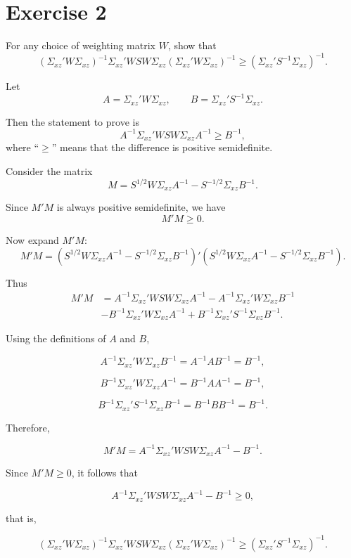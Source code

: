 \documentclass[12pt, letterpaper, onecolumn]{exam}
\begin{document}
\section*{Exercise 2}
For any choice of weighting matrix $W$, show that
$$
    (\Sigma_{xz}' W \Sigma_{xz})^{-1}\Sigma_{xz}' W S W \Sigma_{xz}(\Sigma_{xz}' W \Sigma_{xz})^{-1}
    \geq
    (\Sigma_{xz}' S^{-1}\Sigma_{xz})^{-1}.
$$
\begin{solution}
    Let $$A=\Sigma_{xz}'W\Sigma_{xz}, \qquad B=\Sigma_{xz}'S^{-1}\Sigma_{xz}.$$

    Then the statement to prove is
    $$A^{-1}\Sigma_{xz}'WSW\Sigma_{xz}A^{-1}\ge B^{-1},$$
    where “$\ge$” means that the difference is positive semidefinite.

    Consider the matrix
    $$M=S^{1/2}W\Sigma_{xz}A^{-1}-S^{-1/2}\Sigma_{xz}B^{-1}.$$

    Since $M'M$ is always positive semidefinite, we have
    $$M'M\ge 0.$$

    Now expand $M'M$:
    $$
        M'M
        =
        \left(S^{1/2}W\Sigma_{xz}A^{-1}-S^{-1/2}\Sigma_{xz}B^{-1}\right)'
        \left(S^{1/2}W\Sigma_{xz}A^{-1}-S^{-1/2}\Sigma_{xz}B^{-1}\right).
    $$

    Thus
    $$
        \begin{aligned}
            M'M
             & =A^{-1}\Sigma_{xz}'WSW\Sigma_{xz}A^{-1}-A^{-1}\Sigma_{xz}'W\Sigma_{xz}B^{-1}     \\
             & -B^{-1}\Sigma_{xz}'W\Sigma_{xz}A^{-1}+B^{-1}\Sigma_{xz}'S^{-1}\Sigma_{xz}B^{-1}.
        \end{aligned}
    $$

    Using the definitions of $A$ and $B$,

    $$
        A^{-1}\Sigma_{xz}'W\Sigma_{xz}B^{-1}=A^{-1}AB^{-1}=B^{-1},
    $$

    $$
        B^{-1}\Sigma_{xz}'W\Sigma_{xz}A^{-1}=B^{-1}AA^{-1}=B^{-1},
    $$

    $$
        B^{-1}\Sigma_{xz}'S^{-1}\Sigma_{xz}B^{-1}=B^{-1}BB^{-1}=B^{-1}.
    $$

    Therefore,

    $$
        M'M
        =
        A^{-1}\Sigma_{xz}'WSW\Sigma_{xz}A^{-1}-B^{-1}.
    $$

    Since $M'M\ge 0$, it follows that

    $$
        A^{-1}\Sigma_{xz}'WSW\Sigma_{xz}A^{-1}-B^{-1}\ge 0,
    $$

    that is,

    $$
        (\Sigma_{xz}' W \Sigma_{xz})^{-1}\Sigma_{xz}' W S W \Sigma_{xz}(\Sigma_{xz}' W \Sigma_{xz})^{-1}
        \geq
        (\Sigma_{xz}' S^{-1}\Sigma_{xz})^{-1}.
    $$
\end{solution}
\end{document}
